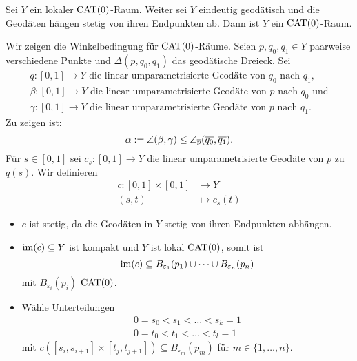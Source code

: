 \begin{satz}
\label{satz:2.47}
	Sei $Y$ ein lokaler $\operatorname{CAT(0)}$-Raum.
	Weiter sei $Y$ eindeutig geodätisch und die Geodäten hängen stetig von ihren Endpunkten ab.
	Dann ist $Y$ ein $\operatorname{CAT(0)}$-Raum.
\end{satz}

\begin{beweis}
	Wir zeigen die Winkelbedingung für $\operatorname{CAT(0)}$-Räume.
	Seien $p,q_0,q_1 \in Y$ paarweise verschiedene Punkte und $\Delta(p,q_0,q_1)$ das geodätische Dreieck.
	Sei 
	\[
		\begin{array}{l}
			q\colon [0,1] \rightarrow Y \text{ die linear umparametrisierte Geodäte von } q_0 \text{ nach } q_1, \\
			\beta\colon [0,1] \rightarrow Y \text{ die linear umparametrisierte Geodäte von } p \text{ nach } q_0 \text{ und} \\
			\gamma\colon [0,1] \rightarrow Y \text{ die linear umparametrisierte Geodäte von } p \text{ nach } q_1.
		\end{array}
	\]
	Zu zeigen ist:
	\[
		\alpha := \angle(\beta,\gamma) \leq \angle_{\overline{p}}(\overline{q_0},\overline{q_1}).
	\]
	Für $s \in [0,1]$ sei $c_s \colon [0,1] \rightarrow Y$ die linear umparametrisierte Geodäte von $p$ zu $q(s)$.
	Wir definieren
	\begin{align*}
		c\colon [0,1] \times [0,1] &\longrightarrow Y \\
		(s,t) &\longmapsto c_s(t)
	\end{align*}
	\begin{itemize}
		\item $c$ ist stetig, da die Geodäten in $Y$ stetig von ihren Endpunkten abhängen.
		\item $\operatorname{im}(c) \subseteq Y$ ist kompakt und $Y$ ist lokal $\operatorname{CAT(0)}$, somit ist
		\[
			\operatorname{im}(c) \subseteq B_{\varepsilon_1}(p_1) \cup \dots \cup B_{\varepsilon_n}(p_n)
		\]
		mit $B_{\varepsilon_i}(p_i)$ $\operatorname{CAT(0)}$.
		\item Wähle Unterteilungen
		\[
			\begin{array}{c}
				0  = s_0 < s_1 < \dots < s_k = 1 \\
				0 = t_0 < t_1 < \dots < t_l = 1
			\end{array}
		\]
		mit $c([s_i,s_{i+1}] \times [t_j,t_{j+1}]) \subseteq B_{\varepsilon_m}(p_m)$ für $m \in \{1,\dots,n\}$. 
	\end{itemize}
\end{beweis}
\cleardoubleoddemptypage